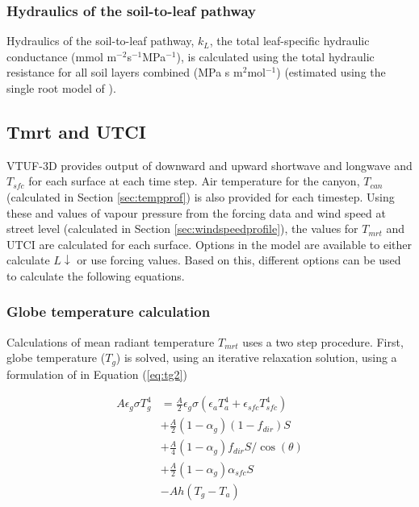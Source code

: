 \documentclass[final,3p,times,authoryear]{elsarticle}
\begin{document}
\subsubsection{Hydraulics of the soil-to-leaf pathway}

Hydraulics of the soil-to-leaf pathway, $k_{L}$, the total leaf-specific hydraulic conductance (mmol m$^{-2}$s$^{-1}$MPa$^{-1}$), is calculated using the total hydraulic resistance for all soil layers combined (MPa s m$^{2}$mol$^{-1}$) (estimated using the single root model of \cite{Gardner1960}).






\subsection{Tmrt and UTCI}\label{sec:tmrtutci}

VTUF-3D provides output of downward and upward shortwave and longwave and $T_{sfc}$ for each surface at each time step. Air temperature for the canyon, $T_{can}$ (calculated in Section \ref{sec:tempprof}) is also provided for each timestep. Using these and values of vapour pressure from the forcing data and wind speed at street level (calculated in Section \ref{sec:windspeedprofile}), the values for $T_{mrt}$ and UTCI are calculated for each surface. Options in the model are available to either calculate $L\downarrow$ or use forcing values. Based on this, different options can be used to calculate the following equations.

\subsubsection{Globe temperature calculation}

Calculations of mean radiant temperature $T_{mrt}$ uses a two step procedure. First, globe temperature ($T_{g}$) is solved, using an iterative relaxation solution, using a formulation of \cite{Liljegren2008} in Equation (\ref{eq:tg2}) 


\begin{equation}\label{eq:tg2}
\begin{split}
A\epsilon_{g}\sigma T_{g}^{4} &= \frac{A}{2} \epsilon_{g}\sigma( \epsilon_{a} T_{a}^{4} +  \epsilon_{sfc} T_{sfc}^{4} ) \\
&+ \frac{A}{2}( 1-\alpha_{g})(1-f_{dir})S  \\
&+ \frac{A}{4}( 1-\alpha_{g})f_{dir}S /\cos(\theta) \\
&+ \frac{A}{2}( 1-\alpha_{g})\alpha_{sfc}S \\
&- Ah(T_{g}-T_{a})   
\end{split}
\end{equation}
\end{document}
